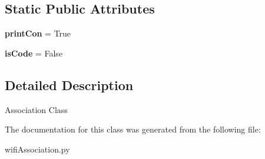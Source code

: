 \subsection*{Static Public Attributes}
\begin{DoxyCompactItemize}
\item 
\hypertarget{classmininet_1_1wifiAssociation_1_1association_a3fd340c4d41ae1896ec4c2f3f878a116}{{\bfseries print\-Con} = True}\label{classmininet_1_1wifiAssociation_1_1association_a3fd340c4d41ae1896ec4c2f3f878a116}

\item 
\hypertarget{classmininet_1_1wifiAssociation_1_1association_a0463e8bd7c7030afc3626dbc5184cb56}{{\bfseries is\-Code} = False}\label{classmininet_1_1wifiAssociation_1_1association_a0463e8bd7c7030afc3626dbc5184cb56}

\end{DoxyCompactItemize}


\subsection{Detailed Description}
\begin{DoxyVerb}Association Class\end{DoxyVerb}
 

The documentation for this class was generated from the following file\-:\begin{DoxyCompactItemize}
\item 
wifi\-Association.\-py\end{DoxyCompactItemize}
